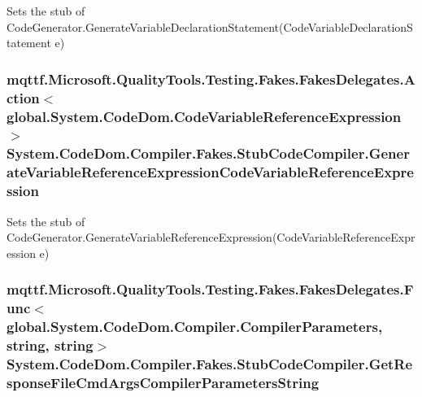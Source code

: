 Sets the stub of Code\-Generator.\-Generate\-Variable\-Declaration\-Statement(\-Code\-Variable\-Declaration\-Statement e)

\hypertarget{class_system_1_1_code_dom_1_1_compiler_1_1_fakes_1_1_stub_code_compiler_adc77514c772df1de685a8172a423e584}{
\subsubsection[{Generate\-Variable\-Reference\-Expression\-Code\-Variable\-Reference\-Expression}]{\setlength{\rightskip}{0pt plus 5cm}mqttf.\-Microsoft.\-Quality\-Tools.\-Testing.\-Fakes.\-Fakes\-Delegates.\-Action$<$global.\-System.\-Code\-Dom.\-Code\-Variable\-Reference\-Expression$>$ System.\-Code\-Dom.\-Compiler.\-Fakes.\-Stub\-Code\-Compiler.\-Generate\-Variable\-Reference\-Expression\-Code\-Variable\-Reference\-Expression}}\label{class_system_1_1_code_dom_1_1_compiler_1_1_fakes_1_1_stub_code_compiler_adc77514c772df1de685a8172a423e584}


Sets the stub of Code\-Generator.\-Generate\-Variable\-Reference\-Expression(\-Code\-Variable\-Reference\-Expression e)

\hypertarget{class_system_1_1_code_dom_1_1_compiler_1_1_fakes_1_1_stub_code_compiler_acdd63e0e4f92eedb32fae2a6f2c2aa21}{
\subsubsection[{Get\-Response\-File\-Cmd\-Args\-Compiler\-Parameters\-String}]{\setlength{\rightskip}{0pt plus 5cm}mqttf.\-Microsoft.\-Quality\-Tools.\-Testing.\-Fakes.\-Fakes\-Delegates.\-Func$<$global.\-System.\-Code\-Dom.\-Compiler.\-Compiler\-Parameters, string, string$>$ System.\-Code\-Dom.\-Compiler.\-Fakes.\-Stub\-Code\-Compiler.\-Get\-Response\-File\-Cmd\-Args\-Compiler\-Parameters\-String}}\label{class_system_1_1_code_dom_1_1_compiler_1_1_fakes_1_1_stub_code_compiler_acdd63e0e4f92eedb32fae2a6f2c2aa21}


